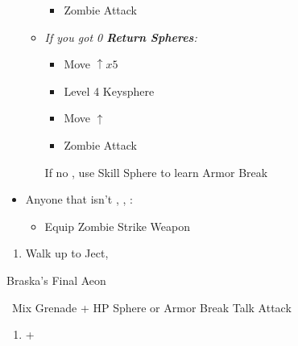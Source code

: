 \begin{spheregrid}
\begin{multicols}{2}
\begin{itemize}
\begin{itemize}
\begin{itemize}
                    	\item Zombie Attack
                    	\end{itemize}
              \item \textit{If you got 0 \textbf{Return Spheres}:}
                    \begin{itemize}
                    \item Move $\uparrow x5$
                    	\item Level 4 Keysphere
                    	\item Move $\uparrow$
                    	\item Zombie Attack
                    \end{itemize}
                    	
                    \rikkuf If no \od, use Skill Sphere to learn Armor Break
                    \end{itemize}
    \end{itemize}
    \end{multicols}
\end{spheregrid}
\begin{multicols}{2}
\begin{equip}
\begin{itemize}
\item Anyone that isn't \tidus, \yuna, \auron:
\begin{itemize}
\item Equip Zombie Strike Weapon
\end{itemize}
\end{itemize}
\end{equip}
\begin{enumerate}[resume]
  \item Walk up to Ject, \cs[4:30]
\end{enumerate}
\vfill
\begin{battle}[180000]{Braska's Final Aeon}
          \begin{itemize}
            \switch{\yuna}{\rikku}
            \rikkuf \od\ Mix Grenade + HP Sphere or Armor Break
            \tidusf Talk
            \switch{\auron}{\yuna}
            \summon{\bahamut}
            \bahamutf Attack
  \end{itemize}
\end{battle}
\end{multicols}
\begin{enumerate}[resume]
  \item \cs+\skippablefmv[4:00]
\end{enumerate}
